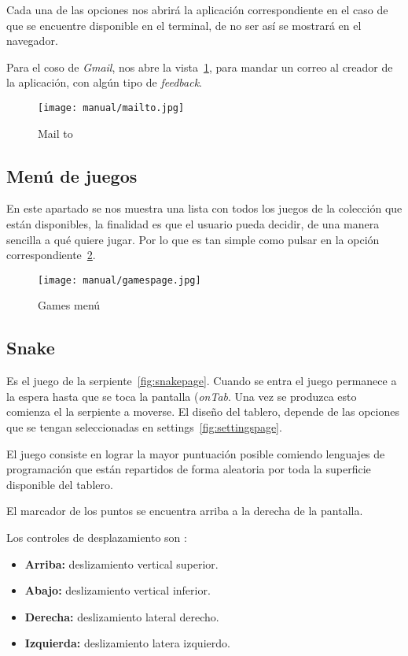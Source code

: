 Cada una de las opciones nos abrirá la aplicación correspondiente en el caso de que se encuentre disponible en el terminal, de no ser así se mostrará en el navegador.

Para el coso de \emph{Gmail}, nos abre la vista~\ref{fig:mailto}, para mandar un correo al creador de la aplicación, con algún tipo de \emph{feedback}.

\begin{figure}[H]
	\centering
	\texttt{[image: manual/mailto.jpg]}
	\caption{Mail to}\label{fig:mailto}
\end{figure}

\subsection{Menú de juegos}\label{menugames}
En este apartado se nos muestra una lista con todos los juegos de la colección que están disponibles, la finalidad es que el usuario pueda decidir, de una manera sencilla a qué quiere jugar. Por lo que es tan simple como pulsar en la opción correspondiente~\ref{fig:gamespage}.

\begin{figure}[H]
	\centering
	\texttt{[image: manual/gamespage.jpg]}
	\caption{Games menú}\label{fig:gamespage}
\end{figure}

\subsection{Snake}\label{snake}
Es el juego de la serpiente~\ref{fig:snakepage}. Cuando se entra el juego permanece a la espera hasta que se toca la pantalla (\emph{onTab}. Una vez se produzca esto comienza el la serpiente a moverse. El diseño del tablero, depende de las opciones que se tengan seleccionadas en settings~\ref{fig:settingspage}.

El juego consiste en lograr la mayor puntuación posible comiendo lenguajes de programación que están repartidos de forma aleatoria por toda la superficie disponible del tablero.

El marcador de los puntos se encuentra arriba a la derecha de la pantalla.

Los controles de desplazamiento son :
\begin{itemize}
	\item \textbf{Arriba:} deslizamiento vertical superior.
	\item \textbf{Abajo:} deslizamiento vertical inferior.
	\item \textbf{Derecha:} deslizamiento lateral derecho.
	\item \textbf{Izquierda:} deslizamiento latera izquierdo.
\end{itemize}

